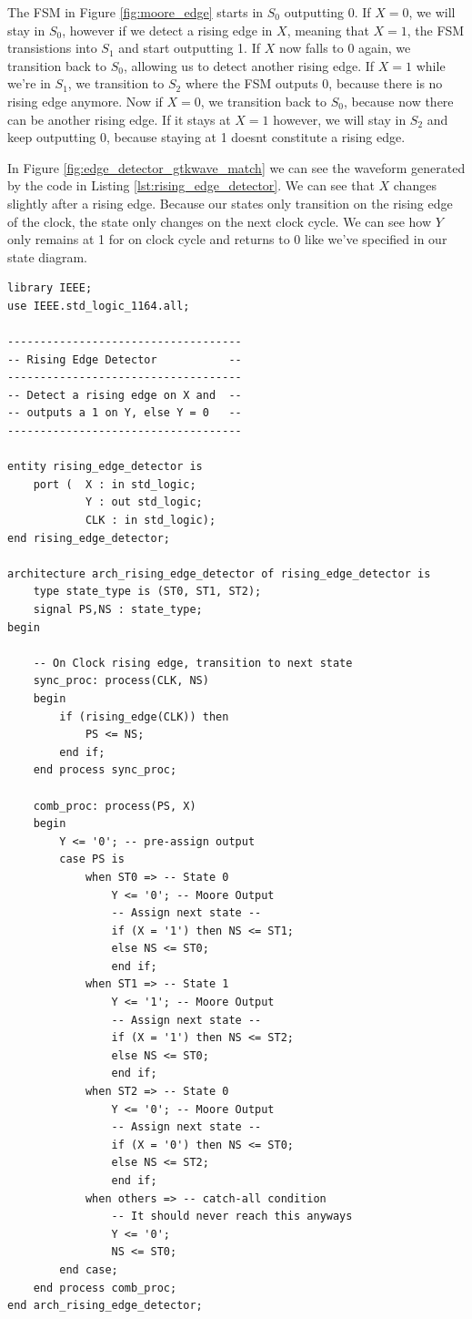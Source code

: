\documentclass[a4paper,10pt]{IEEEtran}
\begin{document}
The FSM in Figure \ref{fig:moore_edge} starts in $S_0$ outputting 0. If $X=0$, we will stay in $S_0$, however if we detect a rising edge in $X$, meaning that $X=1$, the FSM transistions into $S_1$ and start outputting 1. If $X$ now falls to 0 again, we transition back to $S_0$, allowing us to detect another rising edge. If $X=1$ while we're in $S_1$, we transition to $S_2$ where the FSM outputs 0, because there is no rising edge anymore. Now if $X=0$, we transition back to $S_0$, because now there can be another rising edge. If it stays at $X=1$ however, we will stay in $S_2$ and keep outputting 0, because staying at 1 doesnt constitute a rising edge.

In Figure \ref{fig:edge_detector_gtkwave_match} we can see the waveform generated by the code in Listing \ref{lst:rising_edge_detector}. We can see that $X$ changes slightly after a rising edge. Because our states only transition on the rising edge of the clock, the state only changes on the next clock cycle. We can see how $Y$ only remains at 1 for on clock cycle and returns to 0 like we've specified in our state diagram.

\begin{lstlisting}[caption={Example VHDL solution for Figure \ref{fig:moore_edge}}, label={lst:rising_edge_detector}]
library IEEE;
use IEEE.std_logic_1164.all;

------------------------------------
-- Rising Edge Detector           --
------------------------------------
-- Detect a rising edge on X and  --
-- outputs a 1 on Y, else Y = 0   --
------------------------------------

entity rising_edge_detector is
    port (  X : in std_logic;
            Y : out std_logic;
            CLK : in std_logic);
end rising_edge_detector;

architecture arch_rising_edge_detector of rising_edge_detector is
    type state_type is (ST0, ST1, ST2);
    signal PS,NS : state_type;
begin

    -- On Clock rising edge, transition to next state
    sync_proc: process(CLK, NS)
    begin
        if (rising_edge(CLK)) then
            PS <= NS;
        end if;
    end process sync_proc;

    comb_proc: process(PS, X)
    begin
        Y <= '0'; -- pre-assign output
        case PS is
            when ST0 => -- State 0
                Y <= '0'; -- Moore Output
                -- Assign next state --
                if (X = '1') then NS <= ST1;
                else NS <= ST0;
                end if;
            when ST1 => -- State 1
                Y <= '1'; -- Moore Output
                -- Assign next state --
                if (X = '1') then NS <= ST2;
                else NS <= ST0;
                end if;
            when ST2 => -- State 0
                Y <= '0'; -- Moore Output
                -- Assign next state --
                if (X = '0') then NS <= ST0;
                else NS <= ST2;
                end if;
            when others => -- catch-all condition
                -- It should never reach this anyways
                Y <= '0';
                NS <= ST0;
        end case;
    end process comb_proc;
end arch_rising_edge_detector;
\end{lstlisting}
\end{document}
